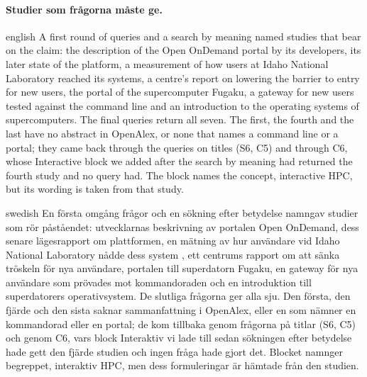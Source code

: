 \paragraph{%
  {Studier som frågorna måste ge.}} %
\begin{onlyin}{english} %
A first round of queries and a search by meaning named studies that bear
on the claim: the description of the Open OnDemand portal by its
developers\autocite{Hudak2018OnDemand}, its later state of the
platform\autocite{Chalker2021OnDemand}, a measurement of how users at
Idaho National Laboratory reached its systems\autocite{Rothwell2022Web},
a centre's report on lowering the barrier to entry for new
users\autocite{Mullen2018Lessons}, the portal of the supercomputer
Fugaku\autocite{Nakao2023Fugaku}, a gateway for new users tested against
the command line\autocite{Sampedro2017Sandstone} and an introduction to
the operating systems of supercomputers\autocite{Gerofi2019Intro}.  The
final queries return all seven.  The first, the fourth and the last have
no abstract in OpenAlex, or none that names a command line or a portal;
they came back through the queries on titles (S6, C5) and through C6,
whose Interactive block we added after the search by meaning had
returned the fourth study and no query had.  The block names the
concept, interactive HPC, but its wording is taken from that study.
\end{onlyin}
\begin{onlyin}{swedish}
En första omgång frågor och en sökning efter betydelse namngav studier
som rör påståendet: utvecklarnas beskrivning av portalen Open
OnDemand\autocite{Hudak2018OnDemand}, dess senare lägesrapport om
plattformen\autocite{Chalker2021OnDemand}, en mätning av hur användare
vid Idaho National Laboratory nådde dess system%
\autocite{Rothwell2022Web}, ett centrums rapport om att sänka tröskeln
för nya användare\autocite{Mullen2018Lessons}, portalen till
superdatorn Fugaku\autocite{Nakao2023Fugaku}, en gateway för nya
användare som prövades mot kommandoraden%
\autocite{Sampedro2017Sandstone} och en introduktion till superdatorers
operativsystem\autocite{Gerofi2019Intro}.  De slutliga frågorna ger alla
sju.  Den första, den fjärde och den sista saknar sammanfattning i
OpenAlex, eller en som nämner en kommandorad eller en portal; de kom
tillbaka genom frågorna på titlar (S6, C5) och genom C6, vars block
Interaktiv vi lade till sedan sökningen efter betydelse hade gett den
fjärde studien och ingen fråga hade gjort det.  Blocket namnger
begreppet, interaktiv HPC, men dess formuleringar är hämtade från den
studien.
\end{onlyin}

